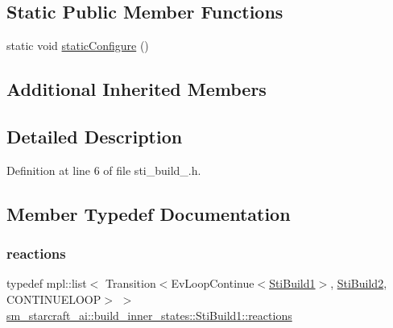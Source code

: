\subsection*{Static Public Member Functions}
\begin{DoxyCompactItemize}
\item 
static void \hyperlink{structsm__starcraft__ai_1_1build__inner__states_1_1StiBuild1_a7450c65f49b3622ca6b2075b854c0c0f}{static\+Configure} ()
\end{DoxyCompactItemize}
\subsection*{Additional Inherited Members}


\subsection{Detailed Description}


Definition at line 6 of file sti\+\_\+build\+\_.\+h.



\subsection{Member Typedef Documentation}
\mbox{\label{structsm__starcraft__ai_1_1build__inner__states_1_1StiBuild1_aabf9de8b9a975d7b8c3ac5ec150706a7}} 
\subsubsection{\texorpdfstring{reactions}{reactions}}
{\footnotesize\ttfamily typedef mpl\+::list$<$ Transition$<$Ev\+Loop\+Continue$<$\hyperlink{structsm__starcraft__ai_1_1build__inner__states_1_1StiBuild1}{Sti\+Build1}$>$, \hyperlink{structsm__starcraft__ai_1_1build__inner__states_1_1StiBuild2}{Sti\+Build2}, C\+O\+N\+T\+I\+N\+U\+E\+L\+O\+OP$>$ $>$ \hyperlink{structsm__starcraft__ai_1_1build__inner__states_1_1StiBuild1_aabf9de8b9a975d7b8c3ac5ec150706a7}{sm\+\_\+starcraft\+\_\+ai\+::build\+\_\+inner\+\_\+states\+::\+Sti\+Build1\+::reactions}}



